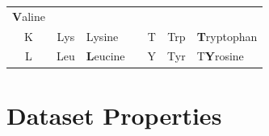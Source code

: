 \documentclass[12pt,a4paper,twoside]{book}
\theoremstyle{definition}
\theoremstyle{definition}
\theoremstyle{remark}
\begin{document}
\begin{longtable}[]{@{}ccllccl@{}}
\begin{minipage}[t]{0.12\columnwidth}
\textbf{V}aline\strut
\end{minipage}\tabularnewline
\begin{minipage}[t]{0.14\columnwidth}\centering\strut
K\strut
\end{minipage} & \begin{minipage}[t]{0.13\columnwidth}\centering\strut
Lys\strut
\end{minipage} & \begin{minipage}[t]{0.13\columnwidth}\raggedright\strut
Lysine\strut
\end{minipage} & \begin{minipage}[t]{0.02\columnwidth}\raggedright\strut
\strut
\end{minipage} & \begin{minipage}[t]{0.13\columnwidth}\centering\strut
T\strut
\end{minipage} & \begin{minipage}[t]{0.13\columnwidth}\centering\strut
Trp\strut
\end{minipage} & \begin{minipage}[t]{0.12\columnwidth}\raggedright\strut
\textbf{T}ryptophan\strut
\end{minipage}\tabularnewline
\begin{minipage}[t]{0.14\columnwidth}\centering\strut
L\strut
\end{minipage} & \begin{minipage}[t]{0.13\columnwidth}\centering\strut
Leu\strut
\end{minipage} & \begin{minipage}[t]{0.13\columnwidth}\raggedright\strut
\textbf{L}eucine\strut
\end{minipage} & \begin{minipage}[t]{0.02\columnwidth}\raggedright\strut
\strut
\end{minipage} & \begin{minipage}[t]{0.13\columnwidth}\centering\strut
Y\strut
\end{minipage} & \begin{minipage}[t]{0.13\columnwidth}\centering\strut
Tyr\strut
\end{minipage} & \begin{minipage}[t]{0.12\columnwidth}\raggedright\strut
T\textbf{Y}rosine\strut
\end{minipage}\tabularnewline
\bottomrule
\end{longtable}

\chapter{Dataset Properties}\label{dataset-properties}
\end{document}
